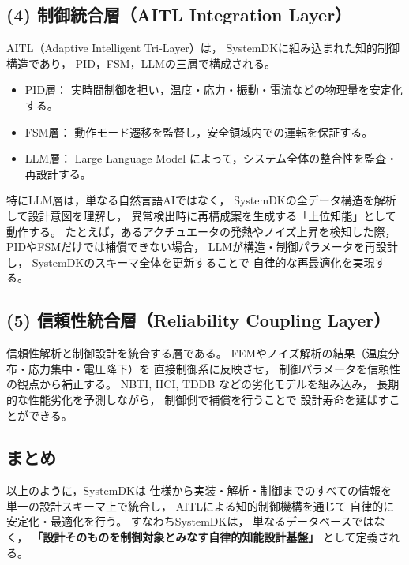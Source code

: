 \subsection{(4) 制御統合層（AITL Integration Layer）}
AITL（Adaptive Intelligent Tri-Layer）は，
SystemDKに組み込まれた知的制御構造であり，
PID，FSM，LLMの三層で構成される。

\begin{itemize}
  \item PID層： 実時間制御を担い，温度・応力・振動・電流などの物理量を安定化する。
  \item FSM層： 動作モード遷移を監督し，安全領域内での運転を保証する。
  \item LLM層： Large Language Model によって，システム全体の整合性を監査・再設計する。
\end{itemize}

特にLLM層は，単なる自然言語AIではなく，
SystemDKの全データ構造を解析して設計意図を理解し，
異常検出時に再構成案を生成する「上位知能」として動作する。
たとえば，あるアクチュエータの発熱やノイズ上昇を検知した際，
PIDやFSMだけでは補償できない場合，
LLMが構造・制御パラメータを再設計し，
SystemDKのスキーマ全体を更新することで
自律的な再最適化を実現する。

\subsection{(5) 信頼性統合層（Reliability Coupling Layer）}
信頼性解析と制御設計を統合する層である。
FEMやノイズ解析の結果（温度分布・応力集中・電圧降下）を
直接制御系に反映させ，
制御パラメータを信頼性の観点から補正する。
NBTI, HCI, TDDB などの劣化モデルを組み込み，
長期的な性能劣化を予測しながら，
制御側で補償を行うことで
設計寿命を延ばすことができる。

\subsection*{まとめ}
以上のように，SystemDKは
仕様から実装・解析・制御までのすべての情報を
単一の設計スキーマ上で統合し，
AITLによる知的制御機構を通じて
自律的に安定化・最適化を行う。
すなわちSystemDKは，
単なるデータベースではなく，
\textbf{「設計そのものを制御対象とみなす自律的知能設計基盤」}
として定義される。
